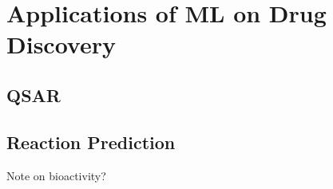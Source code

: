 \section{Applications of ML on Drug Discovery}

\subsection{QSAR}

\subsection{Reaction Prediction}

Note on bioactivity?




